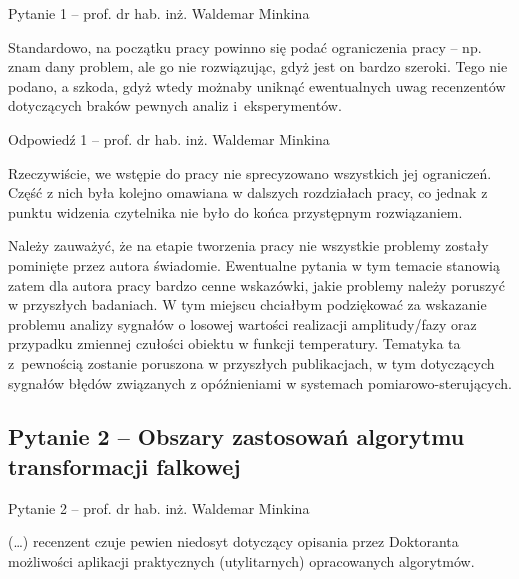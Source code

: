 \documentclass[12pt, polish, aspectratio = 169]{slides}
\begin{document}
\begin{frame}{Pytanie 1 -- prof. dr hab. inż. Waldemar Minkina}\large
\begin{justify}
Standardowo, na początku pracy powinno się podać ograniczenia pracy -- np. znam dany problem, ale go nie rozwiązując, gdyż jest on bardzo szeroki. Tego nie podano, a szkoda, gdyż wtedy możnaby uniknąć ewentualnych uwag recenzentów dotyczących braków pewnych analiz i eksperymentów.
\end{justify}
\end{frame}

\begin{frame}[allowframebreaks]{Odpowiedź 1 -- prof. dr hab. inż. Waldemar Minkina}\small
\begin{justify}
Rzeczywiście, we wstępie do pracy nie sprecyzowano wszystkich jej ograniczeń. Część z nich była kolejno omawiana w dalszych rozdziałach pracy, co jednak z punktu widzenia czytelnika nie było do końca przystępnym rozwiązaniem.

Należy zauważyć, że na etapie tworzenia pracy nie wszystkie problemy zostały pominięte przez autora świadomie. Ewentualne pytania w tym temacie stanowią zatem dla autora pracy bardzo cenne wskazówki, jakie problemy należy poruszyć w przyszłych badaniach. W tym miejscu chciałbym podziękować za wskazanie problemu analizy sygnałów o losowej wartości realizacji amplitudy/fazy oraz przypadku zmiennej czułości obiektu w funkcji temperatury. Tematyka ta z pewnością zostanie poruszona w przyszłych publikacjach, w tym dotyczących sygnałów błędów związanych z opóźnieniami w systemach pomiarowo-sterujących.
\end{justify}
\end{frame}

\subsection{Pytanie 2 -- Obszary zastosowań algorytmu transformacji falkowej}

\begin{frame}{Pytanie 2 -- prof. dr hab. inż. Waldemar Minkina}\large
\begin{justify}
(\dots) recenzent czuje pewien niedosyt dotyczący opisania przez Doktoranta możliwości aplikacji praktycznych (utylitarnych) opracowanych algorytmów.
\end{justify}
\end{frame}
\end{document}
